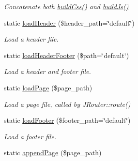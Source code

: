\begin{DoxyCompactItemize}
\begin{DoxyCompactList}\small\item\em Concatenate both \hyperlink{classJPage_a4afc4f7b229e35977c4f9908b8363dcc}{build\-Css()} and \hyperlink{classJPage_ab87eaf4dc5fd15dd14e3b9d35734a7f4}{build\-Js()} \end{DoxyCompactList}\item 
\hypertarget{classJPage_a4222bb1bfbf059a954ace68854e9915c}{static \hyperlink{classJPage_a4222bb1bfbf059a954ace68854e9915c}{load\-Header} (\$header\-\_\-path=\char`\"{}default\char`\"{})}\label{classJPage_a4222bb1bfbf059a954ace68854e9915c}

\begin{DoxyCompactList}\small\item\em Load a header file. \end{DoxyCompactList}\item 
\hypertarget{classJPage_a2797b77b5a08c35681a6e4137760dc65}{static \hyperlink{classJPage_a2797b77b5a08c35681a6e4137760dc65}{load\-Header\-Footer} (\$path=\char`\"{}default\char`\"{})}\label{classJPage_a2797b77b5a08c35681a6e4137760dc65}

\begin{DoxyCompactList}\small\item\em Load a header and footer file. \end{DoxyCompactList}\item 
\hypertarget{classJPage_a8a8c3ecb665ff045c25600f1faeaa658}{static \hyperlink{classJPage_a8a8c3ecb665ff045c25600f1faeaa658}{load\-Page} (\$page\-\_\-path)}\label{classJPage_a8a8c3ecb665ff045c25600f1faeaa658}

\begin{DoxyCompactList}\small\item\em Load a page file, called by J\-Router\-::route() \end{DoxyCompactList}\item 
\hypertarget{classJPage_a0d07b595065a5d71873e261f0d2c3049}{static \hyperlink{classJPage_a0d07b595065a5d71873e261f0d2c3049}{load\-Footer} (\$footer\-\_\-path=\char`\"{}default\char`\"{})}\label{classJPage_a0d07b595065a5d71873e261f0d2c3049}

\begin{DoxyCompactList}\small\item\em Load a footer file. \end{DoxyCompactList}\item 
\hypertarget{classJPage_a77aeca7b3fc83a62b1f91f2aa01db8af}{static \hyperlink{classJPage_a77aeca7b3fc83a62b1f91f2aa01db8af}{append\-Page} (\$page\-\_\-path)}\label{classJPage_a77aeca7b3fc83a62b1f91f2aa01db8af}


\end{DoxyCompactItemize}
